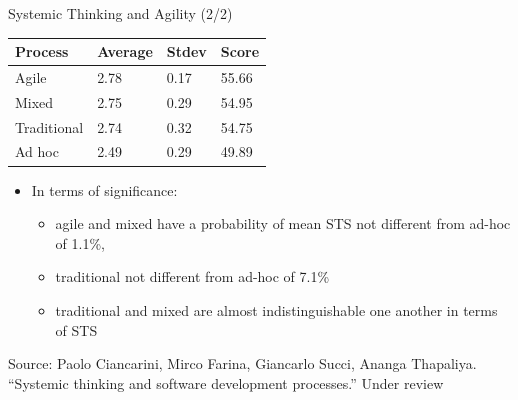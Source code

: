 \documentclass{beamer}
\begin{document}
\begin{frame}
{\centerline{Systemic Thinking and Agility (2/2)}}

\begin{center}
\begin{tabular}{|l|l|l|l|}
\midrule
\textbf{Process}             & \textbf{Average} &  \textbf{Stdev} &  \textbf{Score} \\ \midrule
Agile       & 2.78 & 0.17    & 55.66 \\ \midrule
Mixed  & 2.75 & 0.29    & 54.95 \\ \midrule
Traditional   & 2.74  & 0.32   & 54.75 \\ \midrule
Ad hoc            & 2.49 & 0.29    & 49.89 \\ \midrule
\end{tabular}

\end{center}
\begin{itemize}
\item In terms of significance:
\begin{itemize}
    \item agile and mixed have a probability of mean STS not different from ad-hoc of 1.1\%,
    \item traditional not different from ad-hoc of 7.1\%
    \item traditional and mixed are almost indistinguishable one another in terms of STS
\end{itemize}
\end{itemize}

\begin{center}
    \tiny{Source: Paolo Ciancarini, Mirco Farina, Giancarlo Succi, Ananga Thapaliya. ``Systemic thinking and software development processes.'' Under review}
\end{center}

\end{frame}
\end{document}
